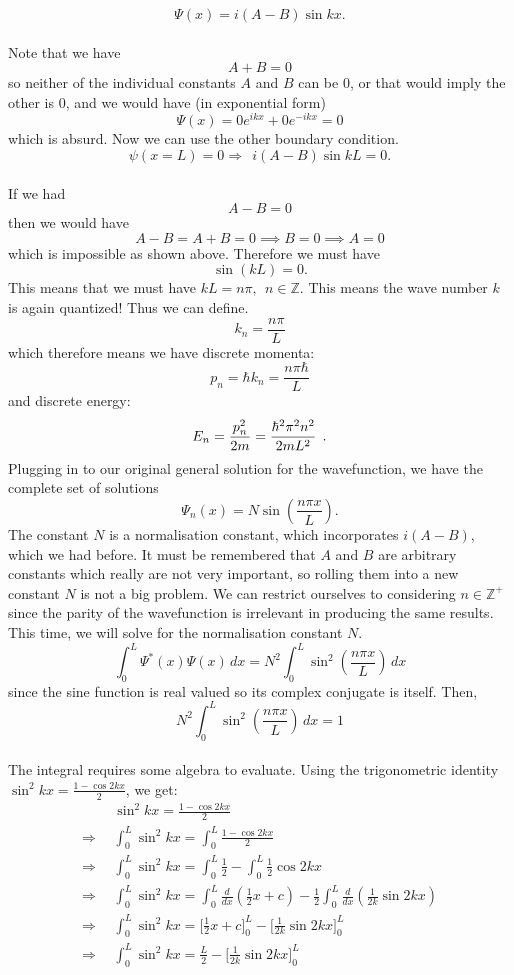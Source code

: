 $$
\Psi(x) = i(A-B)\sin{kx}.
$$
\\
Note that we have 
$$
A+B=0
$$
so neither of the individual constants $A$ and $B$ can be $0$, or that would imply the other is $0$, and we would have (in exponential form)
$$
\Psi(x)=0e^{ikx}+0e^{-ikx}=0
$$
which is absurd.
Now we can use the other boundary condition.
$$
\psi(x=L)=0 \Rightarrow\:\: i(A-B)\sin{kL}=0.
$$
\\
If we had 
$$
A-B=0
$$
then we would have 
$$
A-B=A+B=0 \implies B=0 \implies A=0
$$
which is impossible as shown above. Therefore we must have 
$$
\sin(kL)=0.
$$
This means that we must have $kL=n\pi, \:\: n \in \mathbb{Z}$. This means the wave number $k$ is again quantized! Thus we can define.
$$
k_n=\frac{n\pi}{L}
$$
which therefore means we have discrete momenta:
$$
p_{n}=\hbar k_{n}=\frac{n\pi\hbar}{L}
$$
and discrete energy:
$$
E_{n}=\frac{p_{n}^2}{2m}=\frac{\hbar^2\pi^2 n^2}{2mL^2}\:\:.
$$
Plugging in to our original general solution for the wavefunction, we have the complete set of solutions 
$$
\Psi_{n}(x)=N\sin\left(\frac{n\pi x}{L}\right).
$$
The constant $N$ is a normalisation constant, which incorporates $i(A-B)$, which we had before. It must be remembered that $A$ and $B$ are arbitrary constants which really are not very important, so rolling them into a new constant $N$ is not a big problem. We can restrict ourselves to considering $n \in \mathbb{Z}^+$ since the parity of the wavefunction is irrelevant in producing the same results. This time, we will solve for the normalisation constant $N$.
$$
\int_{0}^{L}\Psi^\ast(x)\Psi(x)\,dx = N^2\int_{0}^{L}\sin^2\left(\frac{n\pi x}{L}\right) \,dx
$$
since the sine function is real valued so its complex conjugate is itself. Then,
$$
N^2\int_{0}^{L}\sin^2\left(\frac{n\pi x}{L}\right) \,dx = 1
$$
\\
The integral requires some algebra to evaluate. Using the trigonometric identity $\sin^2{kx}=\frac{1-\cos{2kx}}{2}$, we get:
$$
\begin{aligned}
&\sin^2{kx}=\frac{1-\cos{2kx}}{2}\\
\Rightarrow\:\: &\int_{0}^{L}\sin^2{kx}=\int_{0}^{L}\frac{1-\cos{2kx}}{2}\\
\Rightarrow\:\: &\int_{0}^{L}\sin^2{kx}=\int_{0}^{L}\frac{1}{2}-\int_{0}^{L}\frac{1}{2}{\cos{2kx}}\\
\Rightarrow\:\: &\int_{0}^{L}\sin^2{kx}=\int_{0}^{L}\frac{d}{dx}\left(\frac{1}{2}x+c\right)-\frac{1}{2}\int_{0}^{L}\frac{d}{dx}\left({\frac{1}{2k}\sin{2kx}}\right)\\
\Rightarrow\:\: &\int_{0}^{L}\sin^2{kx}=\biggl[\frac{1}{2}x+c\biggr]_{0}^{L}-\biggl[\frac{1}{2k}\sin{2kx}\biggr]_{0}^{L}\\
\Rightarrow\:\: &\int_{0}^{L}\sin^2{kx}=\frac{L}{2}-\biggl[\frac{1}{2k}\sin{2kx}\biggr]_{0}^{L}\\
\end{aligned}
$$
